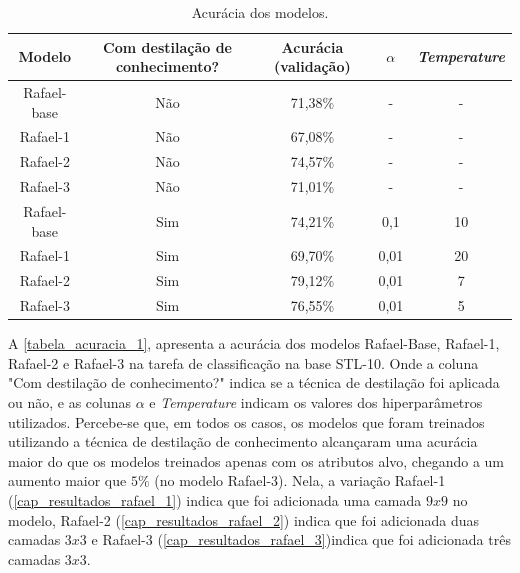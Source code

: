 \begin{center}
\begin{table}[htb]
\centering
\ABNTEXfontereduzida
\caption[Acurácia dos modelos]{Acurácia dos modelos.}
\label{tabela_acuracia_1}
\begin{tabular}{ |c|c|c|c|c| }
	\hline
	\textbf{Modelo} & \textbf{Com destilação de conhecimento?}  & \textbf{Acurácia (validação)}
		   & \textbf{$\alpha$} & \textbf{\textit{Temperature}} \\
	\hline
	Rafael-base 	& 	Não 	& 	71,38\%	& 	- 	& 	-	 \\
	Rafael-1 	& 	Não 	& 	67,08\%	& 	- 	& 	-	 \\
	Rafael-2 	& 	Não 	& 	74,57\%	& 	- 	& 	-	 \\
	Rafael-3 	& 	Não 	& 	71,01\%	& 	- 	& 	-	 \\
	Rafael-base 	& 	Sim 	& 	74,21\%	& 	0,1 	& 	10	 \\
	Rafael-1 	& 	Sim 	& 	69,70\%	& 	0,01 	& 	20	 \\
	Rafael-2 	& 	Sim 	& 	79,12\%	& 	0,01 	& 	7	 \\
	Rafael-3 	& 	Sim 	& 	76,55\%	& 	0,01 	& 	5	 \\
	\hline
\end{tabular}
\end{table}
\end{center}


A \autoref{tabela_acuracia_1}, apresenta a acurácia dos modelos Rafael-Base, Rafael-1, Rafael-2 e Rafael-3 na tarefa de
classificação na base STL-10.
Onde a coluna "Com destilação de conhecimento?" indica se a técnica de destilação foi aplicada
ou não, e as colunas $\alpha$ e \textit{Temperature} indicam os valores dos hiperparâmetros utilizados.
Percebe-se que, em todos os casos, os modelos que foram treinados utilizando a técnica de destilação de conhecimento alcançaram
uma acurácia maior do que os modelos treinados apenas com os atributos alvo, chegando a um aumento maior que $5\%$ (no modelo
Rafael-3).
Nela, a variação Rafael-1 (\autoref{cap_resultados_rafael_1}) indica que foi adicionada uma camada
$9x9$ no modelo, Rafael-2 (\autoref{cap_resultados_rafael_2}) indica que foi adicionada duas camadas $3x3$ e Rafael-3
(\autoref{cap_resultados_rafael_3})indica que foi adicionada três camadas $3x3$.

